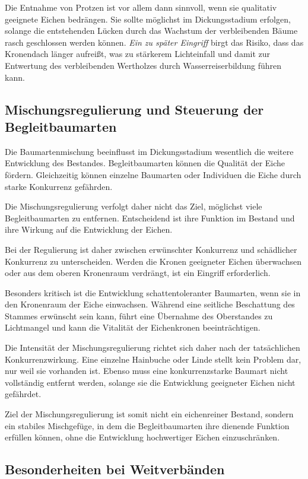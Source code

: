 \documentclass[twocolumn, bibliography=totoc, abstract=true]{scrartcl}
\begin{document}
Die Entnahme von Protzen ist vor allem dann sinnvoll, wenn sie qualitativ geeignete Eichen bedrängen. Sie sollte möglichst im Dickungsstadium erfolgen, solange die entstehenden Lücken durch das Wachstum der verbleibenden Bäume rasch geschlossen werden können. \emph{Ein zu später Eingriff} birgt das Risiko, dass das Kronendach länger aufreißt, was zu stärkerem Lichteinfall und damit zur Entwertung des verbleibenden Wertholzes durch Wasserreiserbildung führen kann.

\subsection{Mischungsregulierung und Steuerung der Begleitbaumarten}

Die Baumartenmischung beeinflusst im Dickungsstadium wesentlich die weitere Entwicklung des Bestandes. Begleitbaumarten können die Qualität der Eiche fördern. Gleichzeitig können einzelne Baumarten oder Individuen die Eiche durch starke Konkurrenz gefährden.

Die Mischungsregulierung verfolgt daher nicht das Ziel, möglichst viele Begleitbaumarten zu entfernen. Entscheidend ist ihre Funktion im Bestand und ihre Wirkung auf die Entwicklung der Eichen.

Bei der Regulierung ist daher zwischen erwünschter Konkurrenz und schädlicher Konkurrenz zu unterscheiden. Werden die Kronen geeigneter Eichen überwachsen oder aus dem oberen Kronenraum verdrängt, ist ein Eingriff erforderlich.

Besonders kritisch ist die Entwicklung schattentoleranter Baumarten, wenn sie in den Kronenraum der Eiche einwachsen. Während eine seitliche Beschattung des Stammes erwünscht sein kann, führt eine Übernahme des Oberstandes zu Lichtmangel und kann die Vitalität der Eichenkronen beeinträchtigen.

Die Intensität der Mischungsregulierung richtet sich daher nach der tatsächlichen Konkurrenzwirkung. Eine einzelne Hainbuche oder Linde stellt kein Problem dar, nur weil sie vorhanden ist. Ebenso muss eine konkurrenzstarke Baumart nicht vollständig entfernt werden, solange sie die Entwicklung geeigneter Eichen nicht gefährdet.

Ziel der Mischungsregulierung ist somit nicht ein eichenreiner Bestand, sondern ein stabiles Mischgefüge, in dem die Begleitbaumarten ihre dienende Funktion erfüllen können, ohne die Entwicklung hochwertiger Eichen einzuschränken.

\subsection{Besonderheiten bei Weitverbänden}
\end{document}
